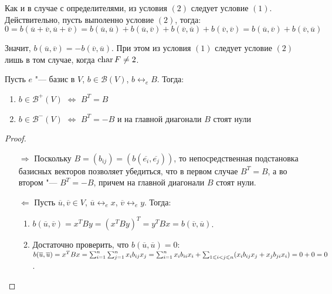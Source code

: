 \begin{note}
	Как и в случае с определителями, из условия $(2)$ следует условие $(1)$. Действительно, пусть выполенно условие $(2)$, тогда:
	\[0 = b(\overline{u} + \overline{v}, \overline{u} + \overline{v}) = b(\overline{u}, \overline{u}) + b(\overline{u}, \overline{v}) + b(\overline{v}, \overline{u}) + b(\overline{v}, \overline{v}) = b(\overline{u}, \overline{v}) + b(\overline{v}, \overline{u})\]
	
	Значит, $b(\overline{u}, \overline{v}) = -b(\overline{v}, \overline{u})$. При этом из условия $(1)$ следует условие $(2)$ лишь в том случае, когда $\operatorname{char}{F} \ne 2$.
\end{note}
\pagebreak
\begin{proposition}
	Пусть $e$ "--- базис в $V$, $b \in \mathcal{B}(V)$, $b \leftrightarrow_e B$. Тогда:
	\begin{enumerate}
		\item $b \in \mathcal{B}^+(V)$ $\Leftrightarrow$ $B^T = B$
		\item $b \in \mathcal{B}^-(V)$ $\Leftrightarrow$ $B^T = -B$ и на главной диагонали $B$ стоят нули
	\end{enumerate}
\end{proposition}

\begin{proof}~
	\begin{itemize}
		\item[$\Rightarrow$] Поскольку $B = (b_{ij}) = (b(\overline{e_i}, \overline{e_j}))$, то непосредственная подстановка базисных векторов позволяет убедиться, что в первом случае $B^T = B$, а во втором "--- $B^T = -B$, причем на главной диагонали $B$ стоят нули.
		
		\item[$\Leftarrow$] Пусть $\overline{u}, \overline{v} \in V$, $\overline{u} \leftrightarrow_e x$, $\overline{v} \leftrightarrow_e y$. Тогда:
		\begin{enumerate}
			\item $b(\overline{u}, \overline{v}) = x^TBy = (x^TBy)^T = y^TBx = b(\overline{v}, \overline{u})$.
			\item Достаточно проверить, что $b(\overline{u}, \overline{u}) = 0$: $b(\overline{u}, \overline{u}) = x^TBx \hm{=} \sum_{i = 1}^n\sum_{j = 1}^nx_ib_{ij}x_j \hm= \sum_{i = 1}^nx_ib_{ii}x_i + \sum_{1 \le i < j \le n}(x_ib_{ij}x_j + x_jb_{ji}x_i) \hm{=} 0 + 0 = 0$.\qedhere
		\end{enumerate}
	\end{itemize}
\end{proof}